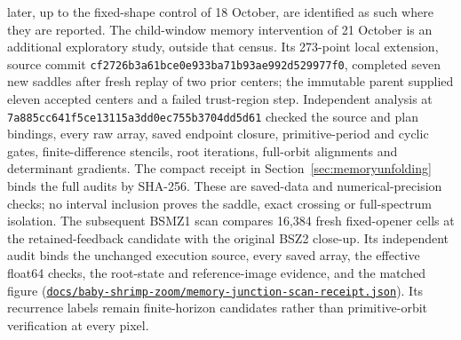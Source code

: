 \documentclass[11pt,letterpaper]{article}
\newcommand{\repourl}{https://github.com/tdj28/neural-shrimp}
\newcommand{\memoryscanrepo}[1]{\href{\repourl/blob/b87a9e74ab364801ce8bb3ee86cc585c2bc2e338/#1}{\nolinkurl{#1}}}
\begin{document}
later, up to the fixed-shape control of 18 October, are identified as such where they are reported.
The child-window memory intervention of 21 October is an additional exploratory study, outside that census. Its
273-point local extension, source commit \texttt{cf2726b3a61bce0e933ba71b93ae992d529977f0}, completed seven new
saddles after fresh replay of two prior centers; the immutable parent supplied eleven accepted centers and a failed
trust-region step. Independent analysis at \texttt{7a885cc641f5ce13115a3dd0ec755b3704dd5d61} checked the source and
plan bindings, every raw array, saved endpoint closure, primitive-period and cyclic gates, finite-difference
stencils, root iterations, full-orbit alignments and determinant gradients. The compact receipt in
Section~\ref{sec:memoryunfolding} binds the full audits by SHA-256. These are saved-data and numerical-precision
checks; no interval inclusion proves the saddle, exact crossing or full-spectrum isolation.
The subsequent BSMZ1 scan compares 16,384 fresh fixed-opener cells at the retained-feedback candidate with the
original BSZ2 close-up. Its independent audit binds the unchanged execution source, every saved array, the
effective float64 checks, the root-state and reference-image evidence, and the matched figure
(\memoryscanrepo{docs/baby-shrimp-zoom/memory-junction-scan-receipt.json}). Its recurrence labels remain
finite-horizon candidates rather than primitive-orbit verification at every pixel.
\end{document}
